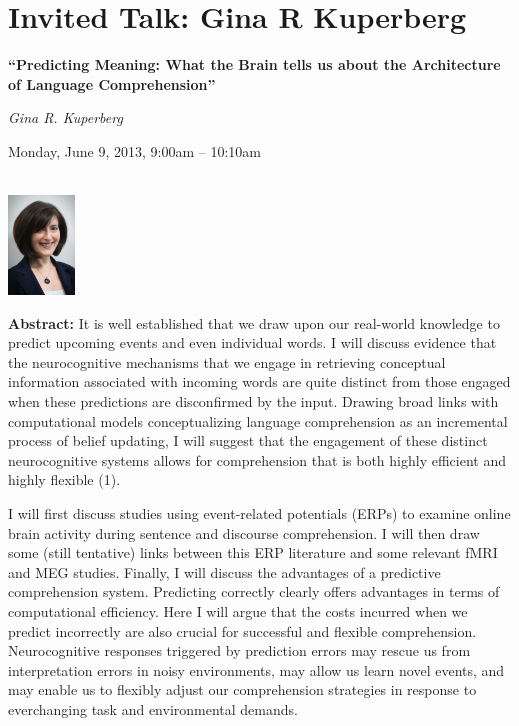 \section{Invited Talk: Gina R Kuperberg}
\begin{center}

\begin{Large}
{\bfseries\Large ``Predicting Meaning: What the Brain tells us about the Architecture of Language Comprehension''}\vspace{1em}\par
\end{Large}

{\itshape Gina R. Kuperberg}\vspace{1em}\par
Monday, June 9, 2013, 9:00am -- 10:10am \vspace{1em}\\
\PlenaryLoc \\
\vspace{1em}\par 
\includegraphics[height=100px]{content/day2/kuperberg-headshot.pdf}
\end{center}

\noindent
{\bfseries Abstract:} It is well established that we draw upon our real-world knowledge to predict
upcoming events and even individual words. I will discuss evidence that the neurocognitive
mechanisms that we engage in retrieving conceptual information associated with incoming words are
quite distinct from those engaged when these predictions are disconfirmed by the input. Drawing
broad links with computational models conceptualizing language comprehension as an incremental
process of belief updating, I will suggest that the engagement of these distinct neurocognitive
systems allows for comprehension that is both highly efficient and highly flexible (1).

I will first discuss studies using event-related potentials (ERPs) to examine online brain activity
during sentence and discourse comprehension. I will then draw some (still tentative) links between
this ERP literature and some relevant fMRI and MEG studies. Finally, I will discuss the advantages
of a predictive comprehension system. Predicting correctly clearly offers advantages in terms of
computational efficiency. Here I will argue that the costs incurred when we predict incorrectly are
also crucial for successful and flexible comprehension. Neurocognitive responses triggered by
prediction errors may rescue us from interpretation errors in noisy environments, may allow us learn
novel events, and may enable us to flexibly adjust our comprehension strategies in response to
everchanging task and environmental demands.

